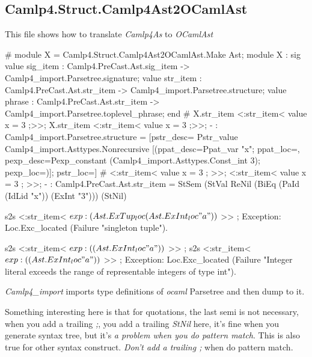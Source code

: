 \subsection{Camlp4.Struct.Camlp4Ast2OCamlAst}
\label{Camlp4.Struct.Camlp4Ast2OCamlAst}

This file shows how to translate \textit{Camlp4As} to
\textit{OCamlAst}


\begin{ocamlcode}
# module X = Camlp4.Struct.Camlp4Ast2OCamlAst.Make Ast;  
module X :
  sig
    value sig_item :
      Camlp4.PreCast.Ast.sig_item ->
      Camlp4_import.Parsetree.signature;
    value str_item :
      Camlp4.PreCast.Ast.str_item ->
      Camlp4_import.Parsetree.structure;
    value phrase :
      Camlp4.PreCast.Ast.str_item ->
      Camlp4_import.Parsetree.toplevel_phrase;
   end
# X.str_item <:str_item< value x = 3 ;>>;
X.str_item <:str_item< value x = 3 ;>>;
- : Camlp4_import.Parsetree.structure =
[{pstr_desc=
   Pstr_value Camlp4_import.Asttypes.Nonrecursive
    [({ppat_desc=Ppat_var "x"; ppat_loc=},
     {pexp_desc=Pexp_constant (Camlp4_import.Asttypes.Const_int 3);
      pexp_loc=})];
  pstr_loc=}]
# <:str_item< value x = 3 ; >>;
<:str_item< value x = 3 ; >>;
- : Camlp4.PreCast.Ast.str_item =
StSem  (StVal  ReNil (BiEq  (PaId  (IdLid  "x")) (ExInt  "3"))) (StNil)
\end{ocamlcode}


\begin{ocamlcode}
s2s <:str_item< $exp: (Ast.ExTup _loc (Ast.ExInt _loc "a")) $ >> ;
Exception: Loc.Exc_located  (Failure "singleton tuple").
\end{ocamlcode}

\begin{ocamlcode}
s2s <:str_item< $exp: ( (Ast.ExInt _loc "a")) $ >> ;
s2s <:str_item< $exp: ( (Ast.ExInt _loc "a")) $ >> ;
Exception:
Loc.Exc_located 
 (Failure
   "Integer literal exceeds the range of representable integers of type int").  
\end{ocamlcode}
   
 
\textit{Camlp4\_import} imports type definitions of \textit{ocaml}
Parsetree and then dump to it.

Something interesting here is that for quotations, the last semi is
not necessary, when you add a trailing \textit{;}, you add a trailing
\textit{StNil} here, it's fine when you generate syntax tree, but it's
\textit{a problem when you do pattern match}.  This is also true for
other syntax construct.  \textit{Don't add a trailing ;} when do
pattern match.

